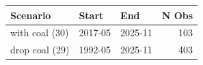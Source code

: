 \begin{tabular}{lllr}
\toprule
Scenario & Start & End & N Obs \\
\midrule
with coal (30) & 2017-05 & 2025-11 & 103 \\
drop coal (29) & 1992-05 & 2025-11 & 403 \\
\bottomrule
\end{tabular}
